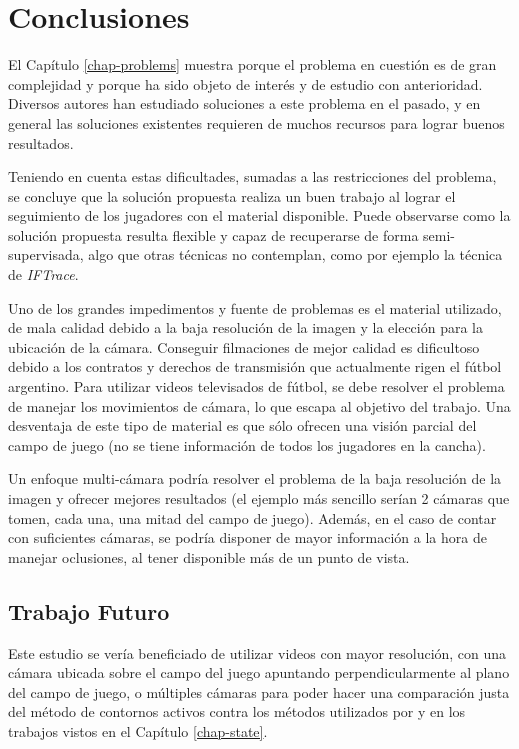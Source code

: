 \chapter{Conclusiones}
\label{chap-conclusion}

El Capítulo \ref{chap-problems} muestra porque el problema en cuestión es de
gran complejidad y porque ha sido objeto de interés y de estudio con
anterioridad. Diversos autores han estudiado soluciones a este problema en el
pasado, y en general las soluciones existentes requieren de muchos recursos
para lograr buenos resultados.

Teniendo en cuenta estas dificultades, sumadas a las restricciones del
problema, se concluye que la solución propuesta realiza un buen trabajo al
lograr el seguimiento de los jugadores con el material disponible. Puede
observarse como la solución propuesta resulta flexible y capaz de recuperarse
de forma semi-supervisada, algo que otras técnicas no contemplan, como por
ejemplo la técnica de \textit{IFTrace}.

Uno de los grandes impedimentos y fuente de problemas es el material utilizado,
de mala calidad debido a la baja resolución de la imagen y la elección para la
ubicación de la cámara. Conseguir filmaciones de mejor calidad es dificultoso
debido a los contratos y derechos de transmisión que actualmente rigen el
fútbol argentino. Para utilizar videos televisados de fútbol, se debe resolver
el problema de manejar los movimientos de cámara, lo que escapa al objetivo del
trabajo. Una desventaja de este tipo de material es que sólo ofrecen una visión
parcial del campo de juego (no se tiene información de todos los jugadores en
la cancha).

Un enfoque multi-cámara podría resolver el problema de la baja resolución de la
imagen y ofrecer mejores resultados (el ejemplo más sencillo serían 2 cámaras
que tomen, cada una, una mitad del campo de juego). Además, en el caso
de contar con suficientes cámaras, se podría disponer de mayor información a la
hora de manejar oclusiones, al tener disponible más de un punto de vista.

\section{Trabajo Futuro}

Este estudio se vería beneficiado de utilizar videos con mayor resolución, con
una cámara ubicada sobre el campo del juego apuntando perpendicularmente al
plano del campo de juego, o múltiples cámaras para poder hacer una comparación
justa del método de contornos activos contra los métodos utilizados por
\citeauthor{xu-8cams} y \citeauthor{papers-tanos} en los trabajos vistos en el
Capítulo \ref{chap-state}.

